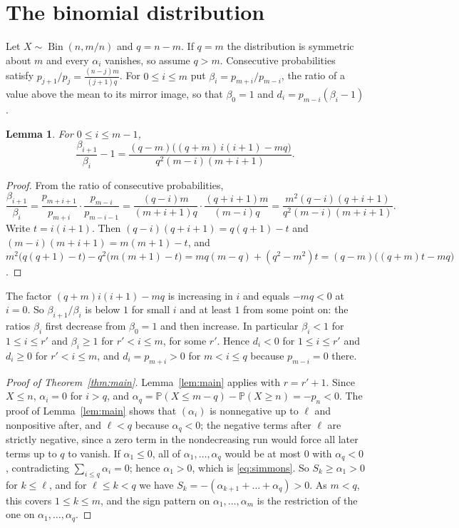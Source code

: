 \documentclass[11pt]{amsart}
\newtheorem{lem}[thm]{Lemma}
\theoremstyle{definition}
\theoremstyle{remark}
\DeclareMathOperator{\Bin}{Bin}
\newcommand{\Prob}{\mathbb P}
\begin{document}
\section{The binomial distribution}\label{sec:binomial}

Let $X\sim\Bin(n,m/n)$ and $q=n-m$. If $q=m$ the distribution is symmetric about $m$ and every $\alpha_i$ vanishes, so
assume $q>m$. Consecutive probabilities satisfy $p_{j+1}/p_j=\frac{(n-j)m}{(j+1)q}$. For $0\le i\le m$ put
$\beta_i=p_{m+i}/p_{m-i}$, the ratio of a value above the mean to its mirror image, so that $\beta_0=1$ and
$d_i=p_{m-i}(\beta_i-1)$.

\begin{lem}\label{lem:ratio}
For $0\le i\le m-1$,
\[
\frac{\beta_{i+1}}{\beta_i}-1=\frac{(q-m)\bigl((q+m)\,i(i+1)-mq\bigr)}{q^2(m-i)(m+i+1)}.
\]
\end{lem}

\begin{proof}
From the ratio of consecutive probabilities,
\[
\frac{\beta_{i+1}}{\beta_i}=\frac{p_{m+i+1}}{p_{m+i}}\cdot\frac{p_{m-i}}{p_{m-i-1}}
=\frac{(q-i)m}{(m+i+1)q}\cdot\frac{(q+i+1)m}{(m-i)q}=\frac{m^2(q-i)(q+i+1)}{q^2(m-i)(m+i+1)}.
\]
Write $t=i(i+1)$. Then $(q-i)(q+i+1)=q(q+1)-t$ and $(m-i)(m+i+1)=m(m+1)-t$, and
$m^2\bigl(q(q+1)-t\bigr)-q^2\bigl(m(m+1)-t\bigr)=mq(m-q)+(q^2-m^2)t=(q-m)\bigl((q+m)t-mq\bigr)$.
\end{proof}

The factor $(q+m)i(i+1)-mq$ is increasing in $i$ and equals $-mq<0$ at $i=0$. So $\beta_{i+1}/\beta_i$ is below $1$
for small $i$ and at least $1$ from some point on: the ratios $\beta_i$ first decrease from $\beta_0=1$ and then
increase. In particular $\beta_i<1$ for $1\le i\le r'$ and $\beta_i\ge1$ for $r'<i\le m$, for some $r'$. Hence
$d_i<0$ for $1\le i\le r'$ and $d_i\ge0$ for $r'<i\le m$, and $d_i=p_{m+i}>0$ for $m<i\le q$ because $p_{m-i}=0$
there.

\begin{proof}[Proof of Theorem~\ref{thm:main}]
Lemma~\ref{lem:main} applies with $r=r'+1$. Since $X\le n$, $\alpha_i=0$ for $i>q$, and
$\alpha_q=\Prob(X\le m-q)-\Prob(X\ge n)=-p_n<0$. The proof of Lemma~\ref{lem:main} shows that $(\alpha_i)$ is
nonnegative up to $\ell$ and nonpositive after, and $\ell<q$ because $\alpha_q<0$; the negative terms after $\ell$ are
strictly negative, since a zero term in the nondecreasing run would force all later terms up to $q$ to vanish. If
$\alpha_1\le0$, all of $\alpha_1,\dots,\alpha_q$ would be at most $0$ with $\alpha_q<0$, contradicting
$\sum_{i\le q}\alpha_i=0$; hence $\alpha_1>0$, which is \eqref{eq:simmons}. So $S_k\ge\alpha_1>0$ for $k\le\ell$, and
for $\ell\le k<q$ we have $S_k=-(\alpha_{k+1}+\dots+\alpha_q)>0$. As $m<q$, this covers $1\le k\le m$, and the sign
pattern on $\alpha_1,\dots,\alpha_m$ is the restriction of the one on $\alpha_1,\dots,\alpha_q$.
\end{proof}
\end{document}
